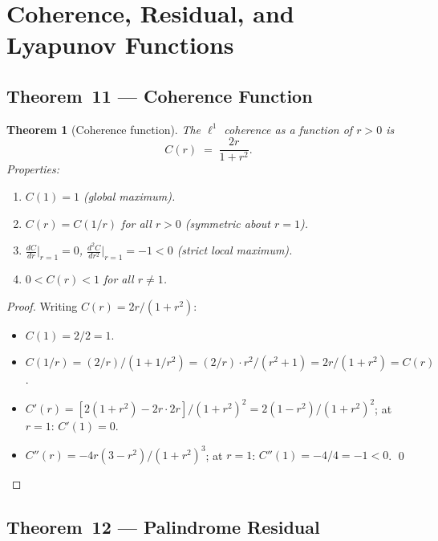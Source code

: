 \documentclass[12pt,a4paper]{article}
\theoremstyle{plain}
\newtheorem{theorem}{Theorem}[section]
\theoremstyle{definition}
\theoremstyle{remark}
\begin{document}
\section{Coherence, Residual, and Lyapunov Functions}
\label{sec:coherence}

\subsection{Theorem~11 — Coherence Function}

\begin{theorem}[Coherence function]\label{thm:11}
  The $\ell^1$ coherence as a function of $r>0$ is
  \begin{equation}
    C(r) \;=\; \frac{2r}{1+r^2}.
    \label{eq:coherence}
  \end{equation}
  Properties:
  \begin{enumerate}
    \item $C(1) = 1$ (global maximum).
    \item $C(r) = C(1/r)$ for all $r>0$ (symmetric about $r=1$).
    \item $\frac{dC}{dr}\big|_{r=1} = 0$,\quad
          $\frac{d^2C}{dr^2}\big|_{r=1} = -1 < 0$ (strict local maximum).
    \item $0 < C(r) < 1$ for all $r\ne 1$.
  \end{enumerate}
\end{theorem}

\begin{proof}
  Writing $C(r)=2r/(1+r^2)$:
  \begin{itemize}
    \item $C(1) = 2/2 = 1$.
    \item $C(1/r) = (2/r)/(1+1/r^2) = (2/r)\cdot r^2/(r^2+1) = 2r/(1+r^2) = C(r)$.
    \item $C'(r) = [2(1+r^2) - 2r\cdot 2r]/(1+r^2)^2 = 2(1-r^2)/(1+r^2)^2$;
          at $r=1$: $C'(1)=0$.
    \item $C''(r) = -4r(3-r^2)/(1+r^2)^3$; at $r=1$: $C''(1)=-4/4=-1<0$. \qed
  \end{itemize}
\end{proof}

\subsection{Theorem~12 — Palindrome Residual}
\end{document}
